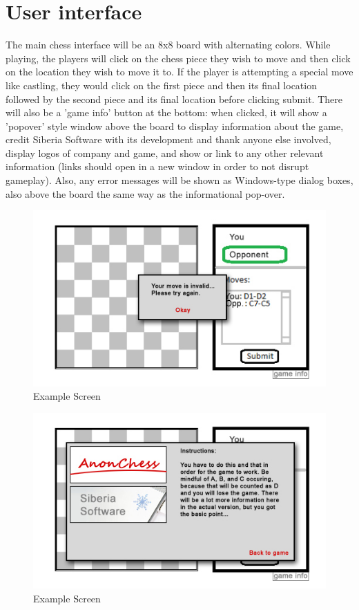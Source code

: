 \section{User interface}

The main chess interface will be an 8x8 board with alternating colors. While playing, the players will click on the chess piece they wish to move and then click on the location they wish to move it to. If the player is attempting a special move like castling, they would click on the first piece and then its final location followed by the second piece and its final location before clicking submit. There will also be a 'game info' button at the bottom: when clicked, it will show a 'popover' style window above the board to display information about the game, credit Siberia Software with its development and thank anyone else involved, display logos of company and game, and show or link to any other relevant information (links should open in a new window in order to not disrupt gameplay). Also, any error messages will be shown as Windows-type dialog boxes, also above the board the same way as the informational pop-over.
\begin{figure}[H]
   \centering
   \includegraphics[scale=1.0]{screenshot7.jpg}
   \caption{Example Screen}
  \end{figure}

\begin{figure}[H]
   \centering
   \includegraphics[scale=1.0]{screenshot4.jpg}
   \caption{Example Screen}
  \end{figure}

